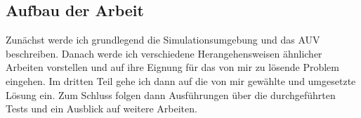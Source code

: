 \subsection{Aufbau der Arbeit}
Zunächst werde ich grundlegend die Simulationsumgebung und das AUV beschreiben. Danach werde ich verschiedene Herangehensweisen ähnlicher Arbeiten vorstellen und auf ihre Eignung für das von mir zu lösende Problem eingehen.
Im dritten Teil gehe ich dann auf die von mir gewählte und umgesetzte Lösung ein. Zum Schluss folgen dann Ausführungen über die durchgeführten Tests und ein Ausblick auf weitere Arbeiten.